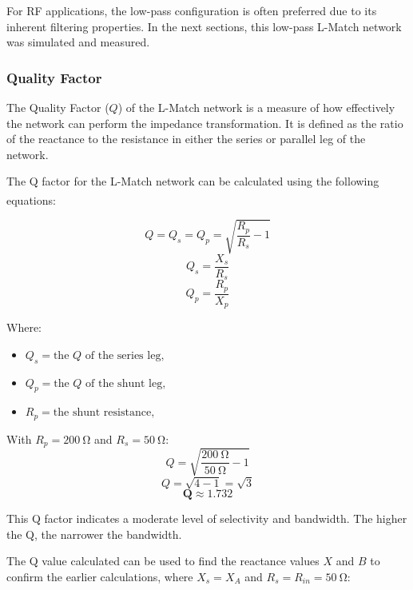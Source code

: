 For RF applications, the low-pass configuration is often preferred due to its inherent filtering properties. In the next sections, this low-pass L-Match network was simulated and measured.

\subsubsection{Quality Factor}
The Quality Factor ($Q$) of the L-Match network is a measure of how effectively the network can perform the impedance transformation. It is defined as the ratio of the reactance to the resistance in either the series or parallel leg of the network.

The Q factor for the L-Match network can be calculated using the following equations\textsuperscript{\cite{bowick2008rf}}:

\begin{equation}
    Q = Q_s = Q_p = \sqrt{\frac{R_p}{R_s} - 1} 
\end{equation}
\begin{equation}
    Q_s = \frac{X_s}{R_s} 
\end{equation}
\begin{equation}
    Q_p = \frac{R_p}{X_p} 
\end{equation}

Where:
\begin{itemize}
    \item $Q_s = \text{the } Q \text{ of the series leg,}$
    \item $Q_p = \text{the } Q \text{ of the shunt leg,}$
    \item $R_p = \text{the shunt resistance,}$
\end{itemize}

With $R_p = \SI{200}{\ohm}$ and $R_s = \SI{50}{\ohm}$:
\begin{equation}
    Q = \sqrt{\frac{\SI{200}{\ohm}}{\SI{50}{\ohm}} - 1}
\end{equation}
\begin{equation}
    Q = \sqrt{4 - 1} = \sqrt{3}
\end{equation}
\begin{equation}
    \mathbf{Q \approx 1.732}
\end{equation}

This Q factor indicates a moderate level of selectivity and bandwidth. The higher the Q, the narrower the bandwidth.

The Q value calculated can be used to find the reactance values $X$ and $B$ to confirm the earlier calculations, where $X_s = X_A$ and $R_s = R_{in} = \SI{50}{\ohm}$:

